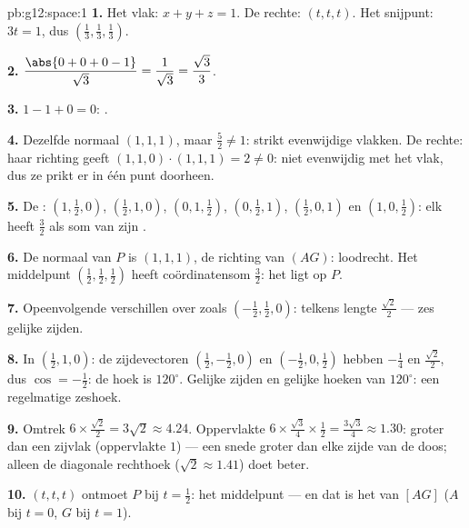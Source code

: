 \begin{solution}{pb:g12:space:1}
\textbf{1.} Het vlak: $x + y + z = 1$. De rechte: $(t, t, t)$. Het snijpunt:
$3t = 1$, dus $\left(\frac13, \frac13, \frac13\right)$.

\textbf{2.} $\dfrac{\abs{0 + 0 + 0 - 1}}{\sqrt3} = \dfrac{1}{\sqrt3} =
\dfrac{\sqrt3}{3}$.

\textbf{3.} $1 - 1 + 0 = 0$: .

\textbf{4.} Dezelfde normaal $(1,1,1)$, maar $\frac52 \neq 1$: strikt
evenwijdige vlakken. De rechte: haar richting geeft
$(1,1,0) \cdot (1,1,1) = 2 \neq 0$: niet evenwijdig met het vlak, dus ze prikt
er in één punt doorheen.

\textbf{5.} De : $\left(1, \frac12, 0\right)$,
$\left(\frac12, 1, 0\right)$, $\left(0, 1, \frac12\right)$,
$\left(0, \frac12, 1\right)$, $\left(\frac12, 0, 1\right)$ en
$\left(1, 0, \frac12\right)$: elk heeft $\frac32$ als som van zijn
.

\textbf{6.} De normaal van $P$ is $(1,1,1)$, de richting van $(AG)$:
loodrecht. Het middelpunt $\left(\frac12,\frac12,\frac12\right)$ heeft
coördinatensom $\frac32$: het ligt op $P$.

\textbf{7.} Opeenvolgende  verschillen over  zoals
$\left(-\frac12, \frac12, 0\right)$: telkens lengte $\frac{\sqrt2}{2}$ ---
zes gelijke zijden.

\textbf{8.} In $\left(\frac12, 1, 0\right)$: de zijdevectoren
$\left(\frac12, -\frac12, 0\right)$ en $\left(-\frac12, 0, \frac12\right)$
hebben  $-\frac14$ en  $\frac{\sqrt2}{2}$, dus
$\cos = -\frac12$: de hoek is $120^\circ$. Gelijke zijden en gelijke hoeken
van $120^\circ$: een regelmatige zeshoek.

\textbf{9.} Omtrek $6 \times \frac{\sqrt2}{2} = 3\sqrt2 \approx 4.24$.
Oppervlakte $6 \times \frac{\sqrt3}{4} \times \frac12 = \frac{3\sqrt3}{4}
\approx 1.30$: groter dan een zijvlak (oppervlakte $1$) --- een snede groter
dan elke zijde van de doos; alleen de diagonale rechthoek
($\sqrt2 \approx 1.41$) doet beter.

\textbf{10.} $(t,t,t)$ ontmoet $P$ bij $t = \frac12$: het middelpunt --- en
dat is het  van $[AG]$ ($A$ bij $t = 0$, $G$ bij $t = 1$).


\end{solution}
